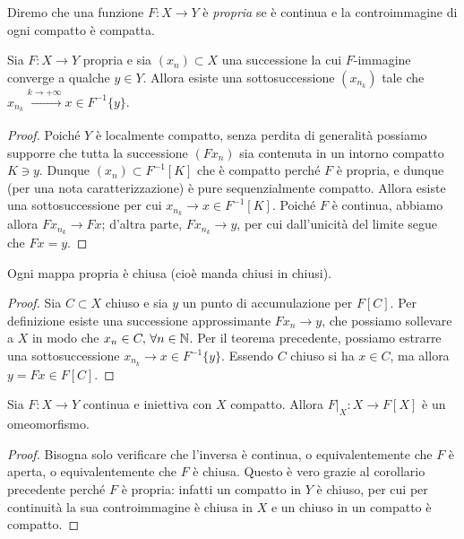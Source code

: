 \begin{definizione}
	Diremo che una funzione $F:X\to Y$ è \emph{propria} se è continua e la controimmagine di ogni compatto è compatta. 
\end{definizione}

\begin{teorema}
	Sia $F:X\to Y$ propria e sia $(x_{n})\subset X$ una successione la cui $F$-immagine converge a qualche $y\in Y$. Allora esiste una sottosuccessione $(x_{n_{k}})$ tale che $x_{n_{k}}\xrightarrow[]{k\to+\infty}x\in F^{-1}\{y\}$.
\end{teorema}
\begin{proof}
	Poiché $Y$ è localmente compatto, senza perdita di generalità possiamo supporre che tutta la successione $(Fx_{n})$ sia contenuta in un intorno compatto $K\ni y$. Dunque $(x_{n})\subset F^{-1}[K]$ che è compatto perché $F$ è propria, e dunque (per una nota caratterizzazione) è pure sequenzialmente compatto. Allora esiste una sottosuccessione per cui $x_{n_{k}}\to x\in F^{-1}[K]$. Poiché $F$ è continua, abbiamo allora $Fx_{n_{k}}\to Fx$; d'altra parte, $Fx_{n_{k}}\to y$, per cui dall'unicità del limite segue che $Fx = y$.
\end{proof}

\begin{corollario}
	Ogni mappa propria è chiusa (cioè manda chiusi in chiusi). 
\end{corollario}
\begin{proof}
	Sia $C\subset X$ chiuso e sia $y$ un punto di accumulazione per $F[C]$. Per definizione esiste una successione approssimante $Fx_{n}\to y$, che possiamo sollevare a $X$ in modo che $x_{n}\in C,\,\forall n\in \mathbb{N}$. Per il teorema precedente, possiamo estrarre una sottosuccessione $x_{n_{k}}\to x\in F^{-1}\{y\}$. Essendo $C$ chiuso si ha $x\in C$, ma allora $y = Fx \in F[C]$.
\end{proof}

\begin{corollario}
	Sia $F:X\to Y$ continua e iniettiva con $X$ compatto. Allora $F\big|_{X}:X\to F[X]$ è un omeomorfismo. 
\end{corollario}
\begin{proof}
	Bisogna solo verificare che l'inversa è continua, o equivalentemente che $F$ è aperta, o equivalentemente che $F$ è chiusa. Questo è vero grazie al corollario precedente perché $F$ è propria: infatti un compatto in $Y$ è chiuso, per cui per continuità la sua controimmagine è chiusa in $X$ e un chiuso in un compatto è compatto. 
\end{proof}

